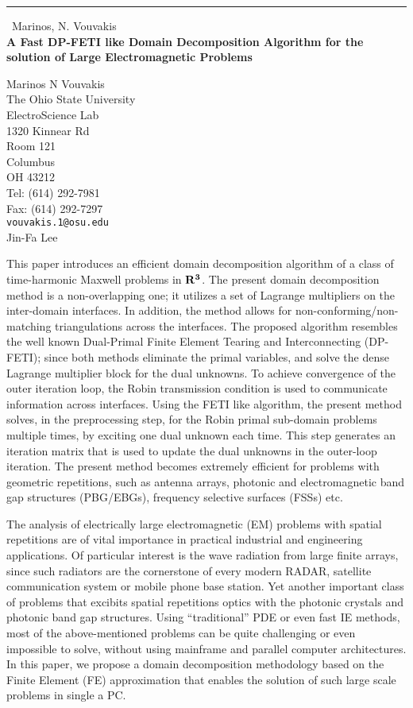 \documentclass{report}
\begin{document}
\begin{center}
\rule{6in}{1pt} \
{\large Marinos, N. Vouvakis \\
{\bf A Fast DP-FETI like Domain Decomposition Algorithm for the solution of Large Electromagnetic Problems}}

Marinos N Vouvakis \\ The Ohio State University \\ ElectroScience Lab \\ 1320 Kinnear Rd  \\ Room 121 \\ Columbus \\ OH 43212 \\ Tel: (614) 292-7981 \\ Fax: (614) 292-7297
\\
{\tt vouvakis.1@osu.edu}\\
Jin-Fa Lee\end{center}

This paper introduces an efficient domain decomposition
algorithm of a class of time-harmonic Maxwell problems in $\bf{R}^3$. The
present domain decomposition method is a non-overlapping one; it
utilizes a set of Lagrange multipliers on the inter-domain interfaces.
In addition, the method allows for non-conforming/non-matching
triangulations across the interfaces. The proposed algorithm resembles
the well known Dual-Primal Finite Element Tearing and Interconnecting
(DP-FETI); since both methods eliminate the primal variables, and
solve the dense Lagrange multiplier block for the dual unknowns. To
achieve convergence of the outer iteration loop, the Robin
transmission condition is used to communicate information across
interfaces. Using the FETI like algorithm, the present method solves,
in the preprocessing step, for the Robin primal sub-domain problems
multiple times, by exciting one dual unknown each time. This step
generates an iteration matrix that is used to update the dual unknowns
in the outer-loop iteration. The present method becomes extremely
efficient for problems with geometric repetitions, such as antenna
arrays, photonic and electromagnetic band gap structures (PBG/EBGs),
frequency selective surfaces (FSSs) etc.

The analysis of electrically large electromagnetic (EM) problems with
spatial repetitions are of vital importance in practical industrial
and engineering applications. Of particular interest is the wave
radiation from large finite arrays, since such radiators are the
cornerstone of every modern RADAR, satellite communication system or
mobile phone base station. Yet another important class of problems
that excibits spatial repetitions optics with the photonic
crystals and photonic band gap structures. Using ``traditional'' PDE
or even fast IE methods, most of the above-mentioned problems can be
quite challenging or even impossible to solve, without using mainframe
and parallel computer architectures. In this paper, we propose a
domain decomposition methodology based on the Finite Element (FE)
approximation that enables the solution of such large scale problems
in single a PC.
\end{document}
